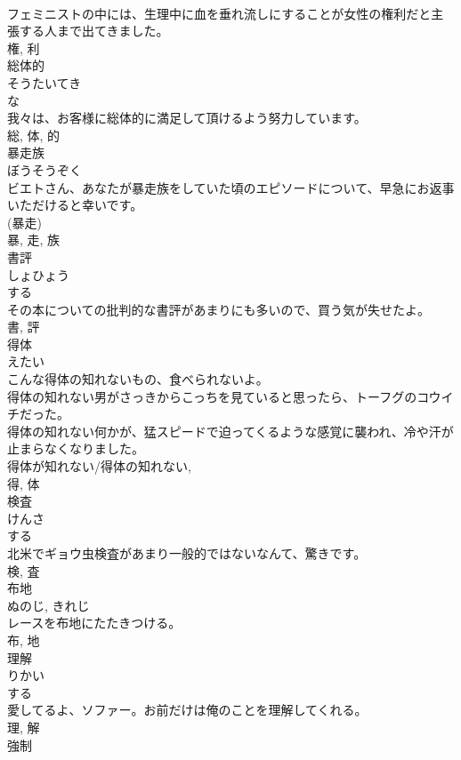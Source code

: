 \documentclass[8pt]{extreport}
\begin{document}
\begin{CJK}{UTF8}{min}
\\	フェミニストの中には、生理中に血を垂れ流しにすることが女性の権利だと主張する人まで出てきました。	
\\	権, 利	
\\	総体的	
\\	そうたいてき	
\\	な 
\\	我々は、お客様に総体的に満足して頂けるよう努力しています。	
\\	総, 体, 的	
\\	暴走族	
\\	ぼうそうぞく	
\\	ビエトさん、あなたが暴走族をしていた頃のエピソードについて、早急にお返事いただけると幸いです。	
\\	(暴走) 
\\	暴, 走, 族	
\\	書評	
\\	しょひょう	
\\	する 
\\	その本についての批判的な書評があまりにも多いので、買う気が失せたよ。	
\\	書, 評	
\\	得体	
\\	えたい	
\\	こんな得体の知れないもの、食べられないよ。	
\\	得体の知れない男がさっきからこっちを見ていると思ったら、トーフグのコウイチだった。	
\\	得体の知れない何かが、猛スピードで迫ってくるような感覚に襲われ、冷や汗が止まらなくなりました。	
\\	得体が知れない/得体の知れない, 
\\	得, 体	
\\	検査	
\\	けんさ	
\\	する 
\\	北米でギョウ虫検査があまり一般的ではないなんて、驚きです。	
\\	検, 査	
\\	布地	
\\	ぬのじ, きれじ	
\\	レースを布地にたたきつける。	
\\	布, 地	
\\	理解	
\\	りかい	
\\	する 
\\	愛してるよ、ソファー。お前だけは俺のことを理解してくれる。	
\\	理, 解	
\\	強制	

\end{CJK}
\end{document}
